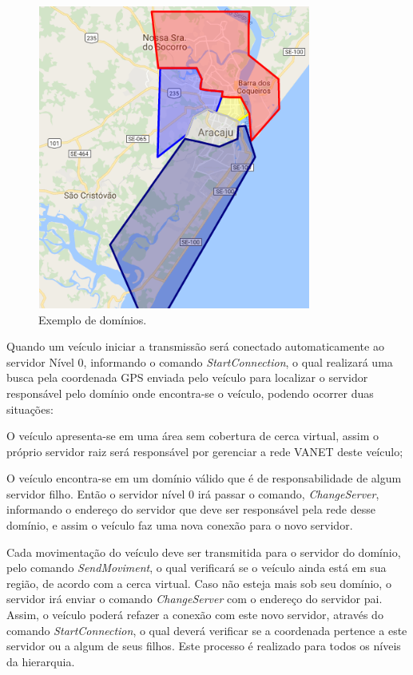 \documentclass[
	12pt,				%
	oneside,			%
	a4paper,			%
	english,			%
	brazil				%
	]{abntex2ppgsi}
\begin{document}
\begin{figure}[h!]
	\centering
	\includegraphics [width=9cm,height=10cm] {images/dominios.png}
	\caption{Exemplo de domínios.}
	\label{fig:dDominios}
\end{figure}


Quando um veículo iniciar a transmissão será conectado automaticamente ao servidor Nível 0, informando o comando \textit{StartConnection}, o qual realizará uma busca pela coordenada GPS enviada pelo veículo para localizar o servidor responsável pelo domínio onde encontra-se o veículo, podendo ocorrer duas situações:
\begin{enumerate*}
	\item{O veículo apresenta-se em uma área sem cobertura de cerca virtual, assim  o próprio servidor raiz será responsável por gerenciar a rede VANET deste veículo;}
	\item{O veículo encontra-se em um domínio válido que é de responsabilidade de algum servidor filho. Então o servidor nível 0 irá passar o comando,  \textit{ChangeServer},  informando o endereço do servidor que deve ser responsável pela rede desse domínio,  e assim o veículo faz uma nova conexão para o novo servidor.}
\end{enumerate*}
 

Cada movimentação do veículo deve ser transmitida para o servidor do domínio, pelo comando \textit{SendMoviment}, o qual verificará se o veículo ainda está em sua região, de acordo com a cerca virtual. Caso não esteja mais sob seu domínio, o servidor irá enviar o comando \textit{ChangeServer} com o endereço do servidor pai. Assim, o veículo poderá refazer a conexão com este novo servidor, através do comando \textit{StartConnection}, o qual deverá verificar se a coordenada pertence a este servidor ou a algum de seus filhos. Este processo é realizado para todos os níveis da hierarquia.
\end{document}
